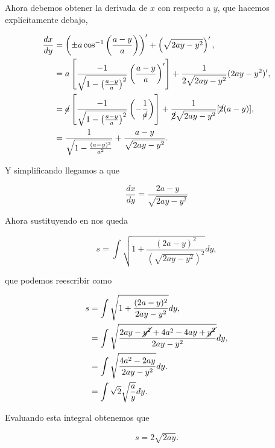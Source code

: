 \documentclass[a4paper,10pt]{article}
\numberwithin{equation}{section}
\begin{document}
Ahora debemos obtener la derivada de $x$ con respecto a $y$, que hacemos explícitamente 
debajo,

\begin{align}
 \begin{split}
  \frac{dx}{dy} &= \left(\pm a \cos^{-1}{\left(\frac{a-y}{a}\right)}\right)' + 
  \left(\sqrt{2ay-y^2}\right)', \\
		&= a \left[ \frac{-1}{\sqrt{1 - \left(\frac{a-y}{a} \right)^2}}
		\left(\frac{a-y}{a} \right)'\right] + \frac{1}{2\sqrt{2ay-y^2}}
		(2ay - y^2)', \\
		&= \cancel{a}\left[ \frac{-1}{\sqrt{1 - \left(\frac{a-y}{a} \right)^2}}
		\left(- \frac{1}{\cancel{a}} \right) \right] + \frac{1}{\cancel{2}\sqrt{2ay-y^2}}
		[\cancel{2}(a - y)], \\
		&= \frac{1}{\sqrt{1 - \frac{(a-y)^2}{a^2}}} + \frac{a-y}{\sqrt{2ay - y^2}}.
 \end{split}
\end{align}

Y simplificando llegamos a que 

\begin{equation}
 \frac{dx}{dy} = \frac{2a - y}{\sqrt{2ay - y^2}}
 \label{eq:dxdyCiclo}
\end{equation}

Ahora sustituyendo  en  nos queda 

\begin{equation}
 s = \int \sqrt{1 + \frac{(2a - y)^2}{(\sqrt{2ay - y^2})^2}} dy,
\end{equation}

que podemos reescribir como

\begin{align}
\begin{split}
 s &= \int \sqrt{1 + \frac{(2a - y)^2}{2ay - y^2}} dy, \\
   &= \int \sqrt{\frac{2ay - \cancel{ y^2} + 4a^2 - 4ay + \cancel{y^2}}{2ay - y^2}} dy, \\  
   &= \int \sqrt{\frac{4a^2 -2ay}{2ay - y^2}} dy.  \\
   &= \int \sqrt{2} \sqrt{\frac{a}{y}} dy.
 \end{split}
\end{align}

Evaluando esta integral obtenemos que 

\begin{equation}
 s = 2 \sqrt{2ay}.
\end{equation}
\end{document}
